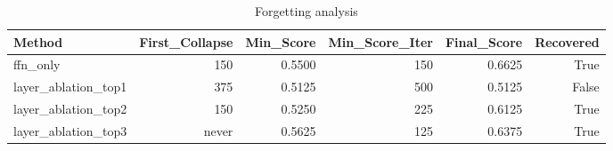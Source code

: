 \begin{table}[htbp]
\centering
\caption{Forgetting analysis}
\label{tab:forgetting}
\begin{tabular}{lrrrrr}
\toprule
\textbf{Method} & \textbf{First\_Collapse} & \textbf{Min\_Score} & \textbf{Min\_Score\_Iter} & \textbf{Final\_Score} & \textbf{Recovered} \\
\midrule
ffn\_only & 150 & 0.5500 & 150 & 0.6625 & True \\
layer\_ablation\_top1 & 375 & 0.5125 & 500 & 0.5125 & False \\
layer\_ablation\_top2 & 150 & 0.5250 & 225 & 0.6125 & True \\
layer\_ablation\_top3 & never & 0.5625 & 125 & 0.6375 & True \\
\bottomrule
\end{tabular}
\end{table}